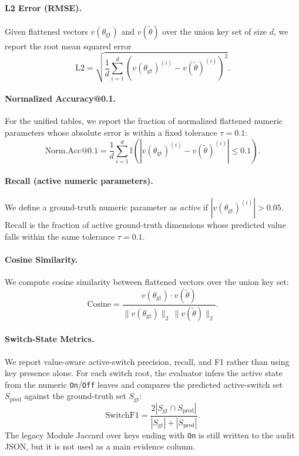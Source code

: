 \paragraph{L2 Error (RMSE).}
Given flattened vectors $v(\theta_{\text{gt}})$ and $v(\tilde{\theta})$ over the union key set of size $d$, we report the root mean squared error
\begin{equation}
	\text{L2} = \sqrt{\frac{1}{d}\sum_{i=1}^{d}\left(v(\theta_{\text{gt}})^{(i)} - v(\tilde{\theta})^{(i)}\right)^2}.
\end{equation}

\paragraph{Normalized Accuracy@0.1.}
For the unified tables, we report the fraction of normalized flattened numeric parameters whose absolute error is within a fixed tolerance $\tau=0.1$:
\begin{equation}
	\text{Norm.Acc@0.1} = \frac{1}{d}\sum_{i=1}^{d}\mathbb{I}\left(\left|v(\theta_{\text{gt}})^{(i)} - v(\tilde{\theta})^{(i)}\right| \leq 0.1\right).
\end{equation}

\paragraph{Recall (active numeric parameters).}
We define a ground-truth numeric parameter as \emph{active} if $\left|v(\theta_{\text{gt}})^{(i)}\right|>0.05$. Recall is the fraction of active ground-truth dimensions whose predicted value falls within the same tolerance $\tau=0.1$.

\paragraph{Cosine Similarity.}
We compute cosine similarity between flattened vectors over the union key set:
\begin{equation}
		\text{Cosine} = \frac{v(\theta_{\text{gt}})\cdot v(\tilde{\theta})}{\|v(\theta_{\text{gt}})\|_2\,\|v(\tilde{\theta})\|_2}.
\end{equation}

\paragraph{Switch-State Metrics.}
We report value-aware active-switch precision, recall, and F1 rather than using key presence alone. For each switch root, the evaluator infers the active state from the numeric \texttt{On}/\texttt{Off} leaves and compares the predicted active-switch set $S_{\text{pred}}$ against the ground-truth set $S_{\text{gt}}$:
\begin{equation}
	\text{SwitchF1} = \frac{2|S_{\text{gt}}\cap S_{\text{pred}}|}{|S_{\text{gt}}|+|S_{\text{pred}}|}.
\end{equation}
The legacy Module Jaccard over keys ending with \texttt{On} is still written to the audit JSON, but it is not used as a main evidence column.

